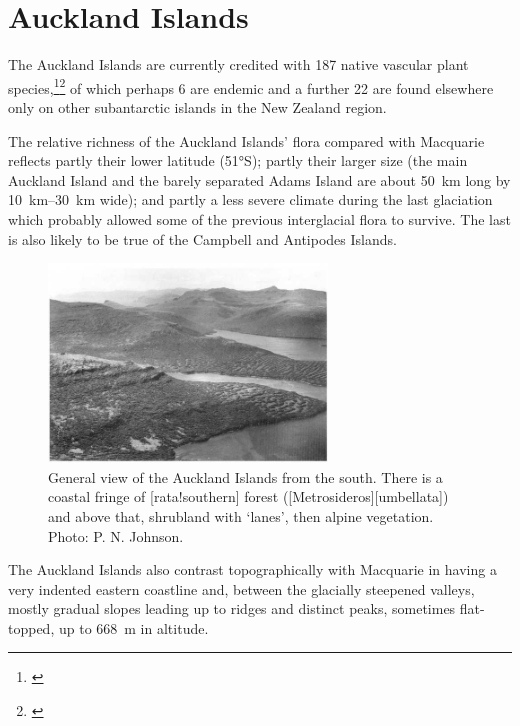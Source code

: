 \section{Auckland Islands}

The Auckland Islands are currently credited with 187 native vascular plant species,\footnote{\cite{meurk1982supplementary}}\footnote{\cite{johnson1975vascular}} of which perhaps 6 are endemic and a further 22 are found elsewhere only on other subantarctic islands in the New Zealand region.

The relative richness of the Auckland Islands' flora compared with Macquarie reflects partly their lower latitude (\ang{51}S); partly their larger size (the main Auckland Island and the barely separated Adams Island are about \SI{50}{\kilo\metre} long by \SIrange{10}{30}{\kilo\metre} wide); and partly a less severe climate during the last glaciation which probably allowed some of the previous interglacial flora to survive.
The last is also likely to be true of the Campbell and Antipodes Islands.

\begin{figure}
	\includegraphics[width=0.66\textwidth]{graphics/figure116auckland-islands.jpg}
	\centering
	\caption[General view of the Auckland Islands from the south]{General view of the Auckland Islands from the south.
	There is a coastal fringe of [rata!southern] forest ([Metrosideros][umbellata]) and above that, shrubland with `lanes', then alpine vegetation.
	Photo: P. N. Johnson.}%
	\label{fig:116auckland-islands}
\end{figure}

The Auckland Islands also contrast topographically with Macquarie in having a very indented eastern coastline and, between the glacially steepened valleys, mostly gradual slopes leading up to ridges and distinct peaks, sometimes flat-topped, up to \SI{668}{\metre} in altitude.

